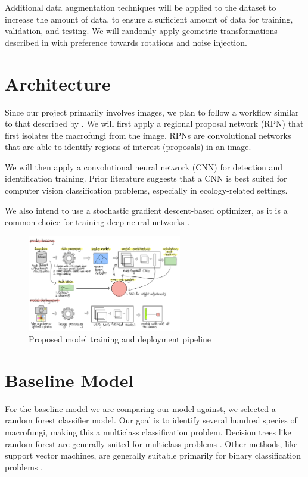 \documentclass{article} %
\begin{document}
Additional data augmentation techniques will be applied to the dataset to increase the amount of data, to ensure a sufficient amount of data for training, validation, and testing. We will randomly apply geometric transformations described in \cite{ShortenKhoshgoftaar.SurveyImageData.2019} with preference towards rotations and noise injection.

\section{Architecture}
Since our project primarily involves images, we plan to follow a workflow similar to that described by \cite{S.RenK.HeEtAl.FasterRCNNRealTime.2017}. We will first apply a regional proposal network (RPN) that first isolates the macrofungi from the image. RPNs are convolutional networks that are able to identify regions of interest (proposals) in an image.

We will then apply a convolutional neural network (CNN) for detection and identification training. Prior literature \citep{BarreStoverEtAl.LeafNetComputerVision.2017} suggests that a CNN is best suited for computer vision classification problems, especially in ecology-related settings.

We also intend to use a stochastic gradient descent-based optimizer, as it is a common choice for training deep neural networks \citep{JamesWittenEtAl.IntroductionStatisticalLearning.2023}.

\begin{figure}[h]
  \begin{center}
  \includegraphics[width=0.6\textwidth]{figures/model.png}
  \end{center}
  \caption{Proposed model training and deployment pipeline}
\end{figure}

\section{Baseline Model}
For the baseline model we are comparing our model against, we selected a random forest classifier model. Our goal is to identify several hundred species of macrofungi, making this a multiclass classification problem. Decision trees like random forest are generally suited for multiclass problems \citep{GallRazaviEtAl.IntroductionRandomForests.2012}. Other methods, like support vector machines, are generally suitable primarily for binary classification problems \citep{JamesWittenEtAl.IntroductionStatisticalLearning.2023}. 
\end{document}
